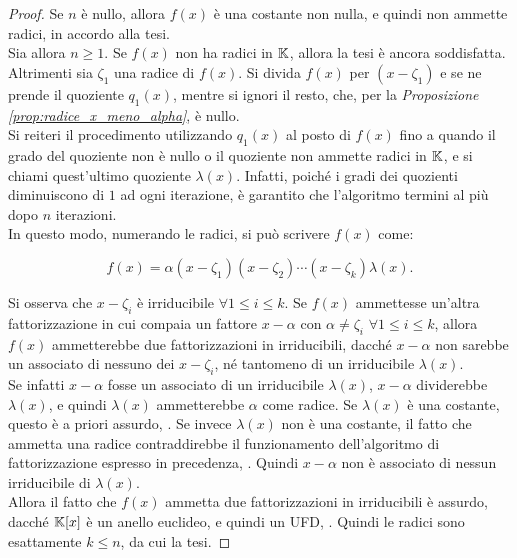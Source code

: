\documentclass[11pt]{scrbook}
\begin{document}
\begin{proof} Se $n$ è nullo, allora $f(x)$ è una costante
    non nulla, e quindi non ammette radici, in accordo alla tesi. \\

    Sia allora $n \geq 1$. Se $f(x)$ non ha radici in $\mathbb{K}$, allora
    la tesi è ancora soddisfatta. Altrimenti sia $\zeta_1$ una radice  di $f(x)$. Si divida $f(x)$ per
    $(x-\zeta_1)$ e se ne prende il quoziente $q_1(x)$, mentre si
    ignori il resto, che,
    per la \textit{Proposizione \ref{prop:radice_x_meno_alpha}},
    è nullo. \\

    Si reiteri il procedimento utilizzando $q_1(x)$ al
    posto di $f(x)$ fino a quando il grado del quoziente non è nullo o
    il quoziente non ammette radici in $\mathbb{K}$, e si chiami quest'ultimo
    quoziente $\lambda(x)$.
    Infatti, poiché i gradi dei quozienti diminuiscono di $1$ ad
    ogni iterazione, è garantito che l'algoritmo termini al più
    dopo $n$ iterazioni. \\

    In questo modo, numerando le radici, si può scrivere $f(x)$ come:

    \begin{equation}
        \label{eq:fattorizzazione_fx}
        f(x)=\alpha(x-\zeta_1)(x-\zeta_2)\cdots(x-\zeta_k)\lambda(x).
    \end{equation}

    \vskip 0.1in

    Si osserva che $x-\zeta_i$ è irriducibile $\forall 1 \leq i \leq k$.
    Se $f(x)$ ammettesse un'altra fattorizzazione in cui compaia
    un fattore $x-\alpha$ con $\alpha \neq \zeta_i$ $\forall 1 \leq i \leq k$, allora $f(x)$ ammetterebbe due fattorizzazioni in
    irriducibili, dacché $x-\alpha$ non sarebbe un associato
    di nessuno dei $x-\zeta_i$, né tantomeno di un
    irriducibile $\lambda(x)$. \\

    Se infatti $x-\alpha$ fosse un associato di un
    irriducibile $\lambda(x)$, $x-\alpha$ dividerebbe
    $\lambda(x)$, e quindi $\lambda(x)$ ammetterebbe $\alpha$ come radice. Se $\lambda(x)$
    è una costante, questo è a priori assurdo, \Lightning{}. Se invece
    $\lambda(x)$ non è una costante, il fatto che ammetta una radice contraddirebbe il funzionamento
    dell'algoritmo di fattorizzazione espresso in precedenza, \Lightning{}. Quindi $x-\alpha$ non è associato di nessun irriducibile di $\lambda(x)$. \\

    Allora il fatto che $f(x)$ ammetta due fattorizzazioni in
    irriducibili è assurdo, dacché $\mathbb{K}[x]$ è un anello euclideo, e
    quindi un UFD, \Lightning{}. Quindi le radici sono esattamente $k \leq n$, da cui la tesi.
\end{proof}
\end{document}
